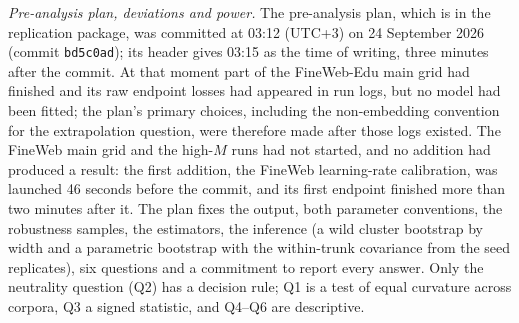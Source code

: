 \textit{Pre-analysis plan, deviations and power.} The pre-analysis plan, which is in the replication package, was
committed at 03:12 (UTC+3) on 24 September 2026 (commit \texttt{bd5c0ad}); its header gives 03:15 as the time of
writing, three minutes after the commit. At that moment part of the FineWeb-Edu main grid had finished and its raw
endpoint losses had appeared in run logs, but no model had been fitted; the plan's primary choices, including the
non-embedding convention for the extrapolation question, were therefore made after those logs existed. The FineWeb main
grid and the high-$M$ runs had not started, and no addition had produced a result: the first addition, the FineWeb
learning-rate calibration, was launched 46 seconds before the commit, and its first endpoint finished more than two
minutes after it. The plan fixes the output, both parameter conventions, the robustness samples, the estimators, the
inference (a wild cluster bootstrap by width and a parametric bootstrap with the within-trunk covariance from the seed
replicates), six questions and a commitment to report every answer. Only the neutrality question (Q2) has a decision
rule; Q1 is a test of equal curvature across corpora, Q3 a signed statistic, and Q4--Q6 are descriptive.

